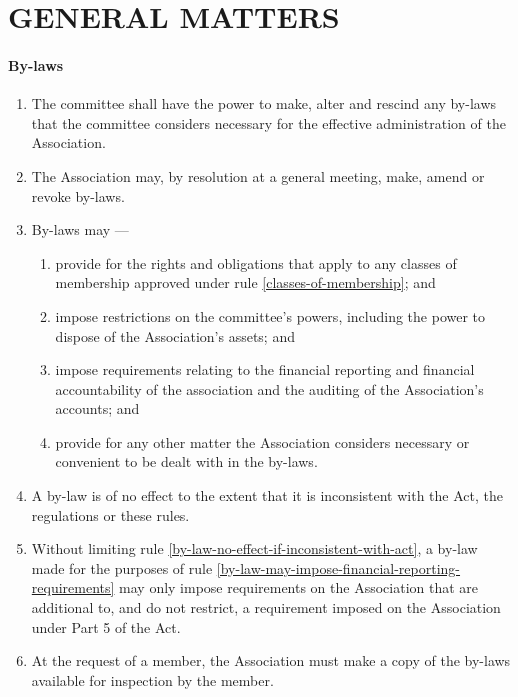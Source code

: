 \documentclass[../constitution.tex]{subfiles}
\begin{document}
\hypertarget{part-8-general-matters}{%
\part{GENERAL MATTERS}\label{part-8-general-matters}}

\hypertarget{by-laws}{%
\subsection{By-laws}\label{by-laws}}

\begin{enumerate}

\item The committee shall have the power to make, alter and rescind any by-laws that the committee considers necessary for the effective administration of the Association.
\item The Association may, by resolution at a general meeting, make, amend or revoke by-laws.
\item By-laws may ---

  \begin{enumerate}
  
  \item provide for the rights and obligations that apply to any classes of membership approved under rule \ref{classes-of-membership}; and
  \item impose restrictions on the committee's powers, including the power to dispose of the Association's assets; and
  \item impose requirements relating to the financial reporting and financial accountability of the association and the auditing of the Association's accounts; and \label{by-law-may-impose-financial-reporting-requirements}
  \item provide for any other matter the Association considers necessary or convenient to be dealt with in the by-laws.
  \end{enumerate}
\item A by-law is of no effect to the extent that it is inconsistent with the Act, the regulations or these rules. \label{by-law-no-effect-if-inconsistent-with-act}
\item Without limiting rule \ref{by-law-no-effect-if-inconsistent-with-act}, a by-law made for the purposes of rule \ref{by-law-may-impose-financial-reporting-requirements} may only impose requirements on the Association that are additional to, and do not restrict, a requirement imposed on the Association under Part 5 of the Act.
\item At the request of a member, the Association must make a copy of the by-laws available for inspection by the member.
\end{enumerate}
\end{document}
